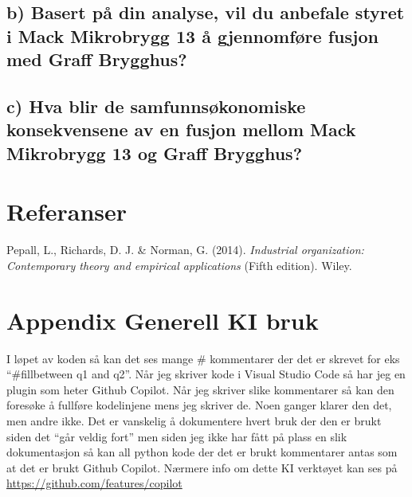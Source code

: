 \documentclass[
  12pt,
  a4paper,
  DIV=11,
  numbers=noendperiod]{scrartcl}
\newlength{\cslhangindent}
\newenvironment{CSLReferences}[2] %
 {\begin{list}{}{%
  \setlength{\itemindent}{0pt}
  \setlength{\leftmargin}{0pt}
  \setlength{\parsep}{0pt}
  \ifodd #1
   \setlength{\leftmargin}{\cslhangindent}
   \setlength{\itemindent}{-1\cslhangindent}
  \fi
  \setlength{\itemsep}{#2\baselineskip}}}
 {\end{list}}
\begin{document}
\subsection{b) Basert på din analyse, vil du anbefale styret i Mack
Mikrobrygg 13 å gjennomføre fusjon med Graff
Brygghus?}\label{b-basert-puxe5-din-analyse-vil-du-anbefale-styret-i-mack-mikrobrygg-13-uxe5-gjennomfuxf8re-fusjon-med-graff-brygghus}

\subsection{c) Hva blir de samfunnsøkonomiske konsekvensene av en fusjon
mellom Mack Mikrobrygg 13 og Graff
Brygghus?}\label{c-hva-blir-de-samfunnsuxf8konomiske-konsekvensene-av-en-fusjon-mellom-mack-mikrobrygg-13-og-graff-brygghus}

\clearpage

\section{Referanser}\label{referanser}

\label{refs}
\begin{CSLReferences}{1}{0}
Pepall, L., Richards, D. J. \& Norman, G. (2014). \emph{Industrial
organization: Contemporary theory and empirical applications} (Fifth
edition). Wiley.

\end{CSLReferences}

\clearpage

\appendix

\section {Appendix Generell KI bruk}

I løpet av koden så kan det ses mange \# kommentarer der det er skrevet
for eks ``\#fillbetween q1 and q2''. Når jeg skriver kode i Visual
Studio Code så har jeg en plugin som heter Github Copilot. Når jeg
skriver slike kommentarer så kan den foresøke å fullføre kodelinjene
mens jeg skriver de. Noen ganger klarer den det, men andre ikke. Det er
vanskelig å dokumentere hvert bruk der den er brukt siden det ``går
veldig fort'' men siden jeg ikke har fått på plass en slik dokumentasjon
så kan all python kode der det er brukt kommentarer antas som at det er
brukt Github Copilot. Nærmere info om dette KI verktøyet kan ses på
\url{https://github.com/features/copilot}
\end{document}
